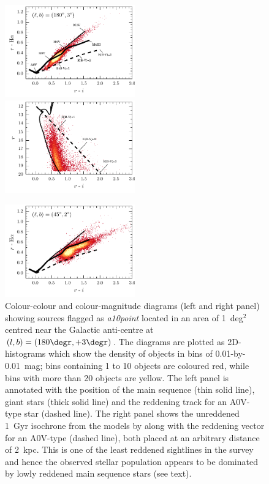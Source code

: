 \documentclass[a4paper,useAMS,usenatbib]{mn2e}
\begin{document}
\begin{figure}
    \begin{minipage}[b]{\linewidth}
        \includegraphics[width=0.5\textwidth]{figures/diagrams/ccd-180-3.pdf} 
        \includegraphics[width=0.5\textwidth]{figures/diagrams/cmd-180-3.pdf}
    \end{minipage}
    \caption{Colour-colour and colour-magnitude diagrams
    (left and right panel)
    showing sources flagged as \emph{a10point}
    located in an area of 1~deg$^2$
    centred near the Galactic anti-centre 
    at $(l,b)=(180\degr,+3\degr)$.
    The diagrams are plotted as 2D-histograms
    which show the density of objects
    in bins of 0.01-by-0.01~mag;
    bins containing 1 to 10 objects are coloured red,
    while bins with more than 20 objects are yellow.
    The left panel is annotated with
    the position of the main sequence (thin solid line),
    giant stars (thick solid line)
    and the reddening track for an A0V-type star (dashed line). 
    The right panel shows the unreddened 1~Gyr isochrone
    from the models by \citet[][solid line]{Bressan2012}
    along with the reddening vector for an A0V-type (dashed line),
    both placed at an arbitrary distance of 2~kpc.
    This is one of the least reddened sightlines
    in the survey
    and hence the observed stellar population appears to be dominated 
    by lowly reddened main sequence stars (see text).}
    \label{fig:l180}
    \begin{minipage}[b]{\linewidth}
        \includegraphics[width=0.5\textwidth]{figures/diagrams/ccd-45-2.pdf}

\end{minipage}
\end{figure}
\end{document}
